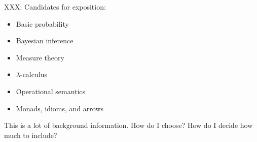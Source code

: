 XXX: Candidates for exposition:
\begin{itemize}
	\item Basic probability
	\item Bayesian inference
	\item Measure theory
	\item $\lambda$-calculus
	\item Operational semantics
	\item Monads, idioms, and arrows
\end{itemize}
This is a lot of background information.
How do I choose?
How do I decide how much to include?
